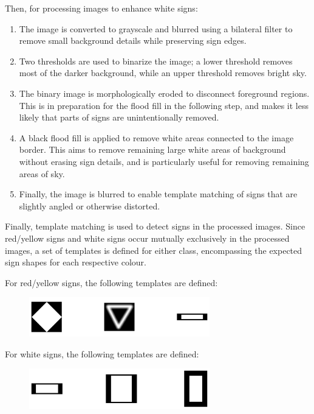 Then, for processing images to enhance white signs:
\begin{enumerate}
  \item The image is converted to grayscale and blurred using a bilateral filter to remove small background details while preserving sign edges.

  \item Two thresholds are used to binarize the image; a lower threshold removes most of the darker background, while an upper threshold removes bright sky.

  \item The binary image is morphologically eroded to disconnect foreground regions. This is in preparation for the flood fill in the following step, and makes it less likely that parts of signs are unintentionally removed.

  \item A black flood fill is applied to remove white areas connected to the image border. This aims to remove remaining large white areas of background without erasing sign details, and is particularly useful for removing remaining areas of sky.

  \item Finally, the image is blurred to enable template matching of signs that are slightly angled or otherwise distorted.

\end{enumerate}

Finally, template matching is used to detect signs in the processed images. Since red/yellow signs and white signs occur mutually exclusively in the processed images, a set of templates is defined for either class, encompassing the expected sign shapes for each respective colour.

\newpage

For red/yellow signs, the following templates are defined:

\begin{figure}[ht]
  \centering
  \includegraphics[width=0.7\textwidth]{images/q1_templates_a.png}
\end{figure}

For white signs, the following templates are defined:

\begin{figure}[ht]
  \centering
  \includegraphics[width=0.7\textwidth]{images/q1_templates_b.png}
\end{figure}

